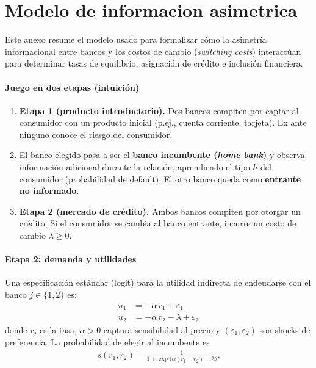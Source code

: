 \documentclass[11pt]{article}
\theoremstyle{plain}
\theoremstyle{plain}
\begin{document}
    \newpage
    \section*{Modelo de informacion asimetrica}
    {\small

    Este anexo resume el modelo  usado para formalizar cómo la asimetría informacional entre bancos y los costos de cambio (\textit{switching costs}) interactúan para determinar tasas de equilibrio, asignación de crédito e inclusión financiera.

    \paragraph{Juego en dos etapas (intuición)}
    \begin{enumerate}
        \item \textbf{Etapa 1 (producto introductorio).} Dos bancos compiten por captar al consumidor con un producto inicial (p.ej., cuenta corriente, tarjeta). Ex ante ninguno conoce el riesgo del consumidor.
        \item El banco elegido pasa a ser el \textbf{banco incumbente (\textit{home bank})} y observa información adicional durante la relación, aprendiendo el tipo $h$ del consumidor (probabilidad de default). El otro banco queda como \textbf{entrante no informado}.
        \item \textbf{Etapa 2 (mercado de crédito).} Ambos bancos compiten por otorgar un crédito. Si el consumidor se cambia al banco entrante, incurre un costo de cambio $\lambda\ge 0$.
    \end{enumerate}

    \paragraph{Etapa 2: demanda y utilidades}
    Una especificación estándar (logit) para la utilidad indirecta de endeudarse con el banco $j\in\{1,2\}$ es:
    \begin{align*}
        u_{1} &= -\alpha\, r_{1} + \varepsilon_{1}\\
        u_{2} &= -\alpha\, r_{2} - \lambda + \varepsilon_{2}
    \end{align*}
    donde $r_j$ es la tasa, $\alpha>0$ captura sensibilidad al precio y $(\varepsilon_1,\varepsilon_2)$ son shocks de preferencia. La probabilidad de elegir al incumbente es
    \begin{align*}
        s(r_1,r_2) = \frac{1}{1+\exp\!\big(\alpha(r_1-r_2)-\lambda\big)}.
    \end{align*}

}
\end{document}
